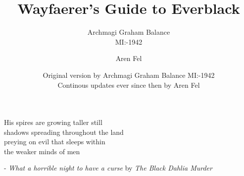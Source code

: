 \documentclass[11pt,a4paper,twocolumn]{scrbook}
\title{Wayfaerer's Guide to Everblack}
\author{
  Archmagi Graham Balance\\
  MI:-1942
  \and
  Aren Fel
}
\date{Original version by Archmagi Graham Balance MI:-1942\\
  Continous updates ever since then by Aren Fel
  }
\newcommand\songquote[3]{
  \onecolumn
  \begin{center}#3\end{center} - \emph{#2} by \emph{#1}
}
\begin{document}
\maketitle

\songquote{The Black Dahlia Murder}{What a horrible night to have a curse}
          {His spires are growing taller still\\shadows spreading
            throughout the land\\preying on evil that sleeps within\\the
            weaker minds of men}
\newpage





\end{document}

